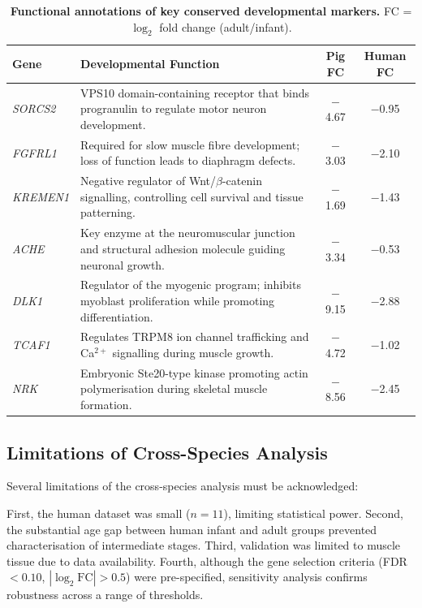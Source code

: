 \begin{table}[H]
\centering
\caption{\textbf{Functional annotations of key conserved developmental markers.} FC = $\log_2$ fold change (adult/infant).}
\label{tab:annotations}
\footnotesize
\begin{tabular}{lp{5.5cm}cc}
\toprule
\textbf{Gene} & \textbf{Developmental Function} & \textbf{Pig FC} & \textbf{Human FC} \\
\midrule
\textit{SORCS2} & VPS10 domain-containing receptor that binds progranulin to regulate motor neuron development. & $-$4.67 & $-$0.95 \\
\addlinespace
\textit{FGFRL1} & Required for slow muscle fibre development; loss of function leads to diaphragm defects. & $-$3.03 & $-$2.10 \\
\addlinespace
\textit{KREMEN1} & Negative regulator of Wnt/$\beta$-catenin signalling, controlling cell survival and tissue patterning. & $-$1.69 & $-$1.43 \\
\addlinespace
\textit{ACHE} & Key enzyme at the neuromuscular junction and structural adhesion molecule guiding neuronal growth. & $-$3.34 & $-$0.53 \\
\addlinespace
\textit{DLK1} & Regulator of the myogenic program; inhibits myoblast proliferation while promoting differentiation. & $-$9.15 & $-$2.88 \\
\addlinespace
\textit{TCAF1} & Regulates TRPM8 ion channel trafficking and Ca$^{2+}$ signalling during muscle growth. & $-$4.72 & $-$1.02 \\
\addlinespace
\textit{NRK} & Embryonic Ste20-type kinase promoting actin polymerisation during skeletal muscle formation. & $-$8.56 & $-$2.45 \\
\bottomrule
\end{tabular}
\end{table}

\subsection{Limitations of Cross-Species Analysis}

Several limitations of the cross-species analysis must be acknowledged:

First, the human dataset was small ($n = 11$), limiting statistical power. Second, the substantial age gap between human infant and adult groups prevented characterisation of intermediate stages. Third, validation was limited to muscle tissue due to data availability. Fourth, although the gene selection criteria (FDR $< 0.10$, $|\log_2\mathrm{FC}| > 0.5$) were pre-specified, sensitivity analysis confirms robustness across a range of thresholds.

